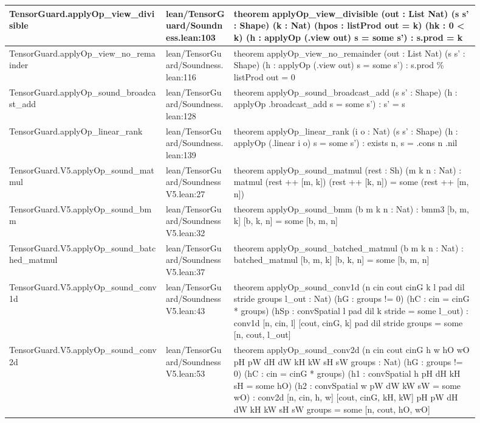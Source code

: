 \documentclass[10pt]{article}
\begin{document}
\begin{longtable}{|p{0.30\linewidth}|p{0.13\linewidth}|p{0.47\linewidth}|}
\hline
TensorGuard.applyOp\_view\_divisible & lean/TensorGuard/Soundness.lean:103 & theorem applyOp\_view\_divisible (out : List Nat) (s s' : Shape) (k : Nat) (hpos : listProd out = k) (hk : 0 < k) (h : applyOp (.view out) s = some s') : s.prod = k \\
\hline
TensorGuard.applyOp\_view\_no\_remainder & lean/TensorGuard/Soundness.lean:116 & theorem applyOp\_view\_no\_remainder (out : List Nat) (s s' : Shape) (h : applyOp (.view out) s = some s') : s.prod \% listProd out = 0 \\
\hline
TensorGuard.applyOp\_sound\_broadcast\_add & lean/TensorGuard/Soundness.lean:128 & theorem applyOp\_sound\_broadcast\_add (s s' : Shape) (h : applyOp .broadcast\_add s = some s') : s' = s \\
\hline
TensorGuard.applyOp\_linear\_rank & lean/TensorGuard/Soundness.lean:139 & theorem applyOp\_linear\_rank (i o : Nat) (s s' : Shape) (h : applyOp (.linear i o) s = some s') : exists n, s = .cons n .nil \\
\hline
TensorGuard.V5.applyOp\_sound\_matmul & lean/TensorGuard/SoundnessV5.lean:27 & theorem applyOp\_sound\_matmul (rest : Sh) (m k n : Nat) : matmul (rest ++ [m, k]) (rest ++ [k, n]) = some (rest ++ [m, n]) \\
\hline
TensorGuard.V5.applyOp\_sound\_bmm & lean/TensorGuard/SoundnessV5.lean:32 & theorem applyOp\_sound\_bmm (b m k n : Nat) : bmm3 [b, m, k] [b, k, n] = some [b, m, n] \\
\hline
TensorGuard.V5.applyOp\_sound\_batched\_matmul & lean/TensorGuard/SoundnessV5.lean:37 & theorem applyOp\_sound\_batched\_matmul (b m k n : Nat) : batched\_matmul [b, m, k] [b, k, n] = some [b, m, n] \\
\hline
TensorGuard.V5.applyOp\_sound\_conv1d & lean/TensorGuard/SoundnessV5.lean:43 & theorem applyOp\_sound\_conv1d (n cin cout cinG k l pad dil stride groups l\_out : Nat) (hG : groups != 0) (hC : cin = cinG * groups) (hSp : convSpatial l pad dil k stride = some l\_out) : conv1d [n, cin, l] [cout, cinG, k] pad dil stride groups = some [n, cout, l\_out] \\
\hline
TensorGuard.V5.applyOp\_sound\_conv2d & lean/TensorGuard/SoundnessV5.lean:53 & theorem applyOp\_sound\_conv2d (n cin cout cinG h w hO wO pH pW dH dW kH kW sH sW groups : Nat) (hG : groups != 0) (hC : cin = cinG * groups) (h1 : convSpatial h pH dH kH sH = some hO) (h2 : convSpatial w pW dW kW sW = some wO) : conv2d [n, cin, h, w] [cout, cinG, kH, kW] pH pW dH dW kH kW sH sW groups = some [n, cout, hO, wO] \\

\end{longtable}
\end{document}

